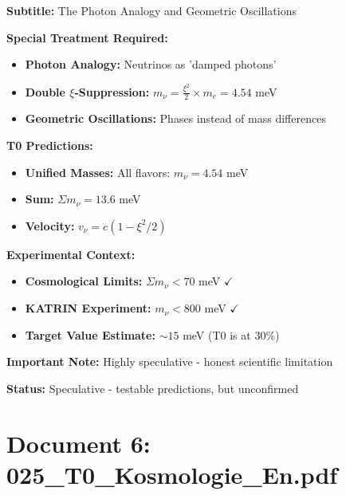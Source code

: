 	\begin{documentbox}
		\textbf{Subtitle:} The Photon Analogy and Geometric Oscillations
		
		\textbf{Special Treatment Required:}
		\begin{itemize}
			\item \textbf{Photon Analogy:} Neutrinos as 'damped photons'
			\item \textbf{Double $\xi$-Suppression:} $m_\nu = \frac{\xi^2}{2} \times m_e = 4.54$ meV
			\item \textbf{Geometric Oscillations:} Phases instead of mass differences
		\end{itemize}
		
		\textbf{T0 Predictions:}
		\begin{itemize}
			\item \textbf{Unified Masses:} All flavors: $m_\nu = 4.54$ meV
			\item \textbf{Sum:} $\Sigma m_\nu = 13.6$ meV
			\item \textbf{Velocity:} $v_\nu = c(1 - \xi^2/2)$
		\end{itemize}
		
		\textbf{Experimental Context:}
		\begin{itemize}
			\item \textbf{Cosmological Limits:} $\Sigma m_\nu < 70$ meV $\checkmark$
			\item \textbf{KATRIN Experiment:} $m_\nu < 800$ meV $\checkmark$
			\item \textbf{Target Value Estimate:} $\sim 15$ meV (T0 is at 30\%)
		\end{itemize}
		
		\textbf{Important Note:} Highly speculative - honest scientific limitation
		
		\textbf{Status:} Speculative - testable predictions, but unconfirmed
	\end{documentbox}
	
	\section{Document 6: 025\_T0\_Kosmologie\_En.pdf}
	
